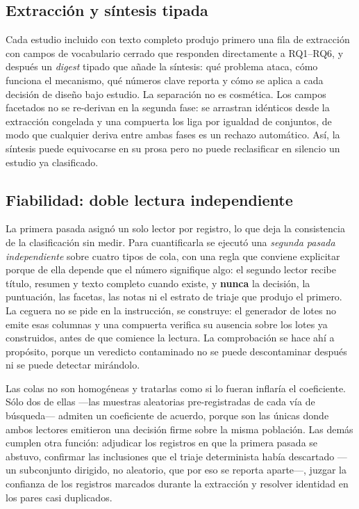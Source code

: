 \documentclass[conference]{IEEEtran}
\begin{document}
\subsection{Extracción y síntesis tipada}
\label{sec:extraction}

Cada estudio incluido con texto completo produjo primero una fila de extracción con campos de
vocabulario cerrado que responden directamente a RQ1--RQ6, y después un \emph{digest} tipado que
añade la síntesis: qué problema ataca, cómo funciona el mecanismo, qué números clave reporta y cómo
se aplica a cada decisión de diseño bajo estudio. La separación no es cosmética. Los campos
facetados no se re-derivan en la segunda fase: se arrastran idénticos desde la extracción congelada y
una compuerta los liga por igualdad de conjuntos, de modo que cualquier deriva entre ambas fases es
un rechazo automático. Así, la síntesis puede equivocarse en su prosa pero no puede reclasificar en
silencio un estudio ya clasificado.

\subsection{Fiabilidad: doble lectura independiente}
\label{sec:reliability}

La primera pasada asignó un solo lector por registro, lo que deja la consistencia de la
clasificación sin medir. Para cuantificarla se ejecutó una \emph{segunda pasada independiente} sobre
cuatro tipos de cola, con una regla que conviene explicitar porque de ella depende que el número
signifique algo: el segundo lector recibe título, resumen y texto completo cuando existe, y
\textbf{nunca} la decisión, la puntuación, las facetas, las notas ni el estrato de triaje que produjo
el primero. La ceguera no se pide en la instrucción, se construye: el generador de lotes no emite
esas columnas y una compuerta verifica su ausencia sobre los lotes ya construidos, antes de que
comience la lectura. La comprobación se hace ahí a propósito, porque un veredicto contaminado no se
puede descontaminar después ni se puede detectar mirándolo.

Las colas no son homogéneas y tratarlas como si lo fueran inflaría el coeficiente. Sólo dos de ellas
—las muestras aleatorias pre-registradas de cada vía de búsqueda— admiten un coeficiente de acuerdo,
porque son las únicas donde ambos lectores emitieron una decisión firme sobre la misma población. Las
demás cumplen otra función: adjudicar los registros en que la primera pasada se abstuvo, confirmar
las inclusiones que el triaje determinista había descartado —un subconjunto dirigido, no aleatorio,
que por eso se reporta aparte—, juzgar la confianza de los registros marcados durante la extracción y
resolver identidad en los pares casi duplicados.
\end{document}
